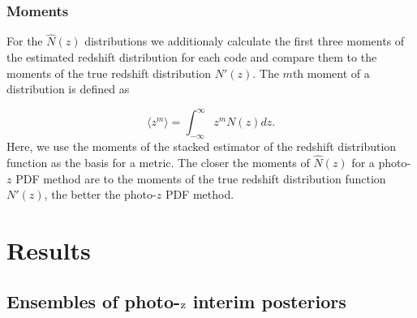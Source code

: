 \documentclass[usenatbib]{mn2e}
\newcommand*\mathinhead[2]{\texorpdfstring{$\boldsymbol{#1}$}{#2}}
\begin{document}
%


\subsubsection{Moments}
\label{sec:moments}
For the $\hat{N}(z)$ distributions we additionaly calculate the first three moments of the estimated redshift distribution for each code and compare them to the moments of the true redshift distribution $N'(z)$.
The $m$th moment of a distribution is defined as

\begin{equation}
\langle z^{m}\rangle = \int_{-\infty}^{\infty}z^{m}N(z)dz.
\end{equation}
Here, we use the moments of the stacked estimator of the redshift distribution function as the basis for a metric. The closer the moments of $\hat{N}(z)$ for a photo-$z$ PDF method are to the moments of the true redshift distribution function $N'(z)$, the better the photo-$z$ PDF method.

\section{Results}
\label{sec:results}

\subsection{Ensembles of photo-\mathinhead{$z$}{z} interim posteriors}
\end{document}
